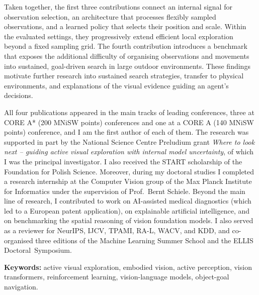 Taken together, the first three contributions connect an internal signal for observation selection, an architecture that processes flexibly sampled observations, and a learned policy that selects their position and scale. Within the evaluated settings, they progressively extend efficient local exploration beyond a fixed sampling grid. The fourth contribution introduces a benchmark that exposes the additional difficulty of organising observations and movements into sustained, goal-driven search in large outdoor environments. These findings motivate further research into sustained search strategies, transfer to physical environments, and explanations of the visual evidence guiding an agent's decisions.

All four publications appeared in the main tracks of leading conferences, three at CORE A* (200 MNiSW points) conferences and one at a CORE A (140 MNiSW points) conference, and I am the first author of each of them. The research was supported in part by the National Science Centre Preludium grant \emph{Where to look next -- guiding active visual exploration with internal model uncertainty}, of which I was the principal investigator. I also received the START scholarship of the Foundation for Polish Science. Moreover, during my doctoral studies I completed a research internship at the Computer Vision group of the Max Planck Institute for Informatics under the supervision of Prof.\ Bernt Schiele. Beyond the main line of research, I contributed to work on AI-assisted medical diagnostics (which led to a European patent application), on explainable artificial intelligence, and on benchmarking the spatial reasoning of vision foundation models. I also served as a reviewer for NeurIPS, IJCV, TPAMI, RA-L, WACV, and KDD, and co-organised three editions of the Machine Learning Summer School and the ELLIS Doctoral~Symposium.

\vspace{1em}
\noindent\textbf{Keywords:} active visual exploration, embodied vision, active perception, vision transformers, reinforcement learning, vision-language models, object-goal navigation.
